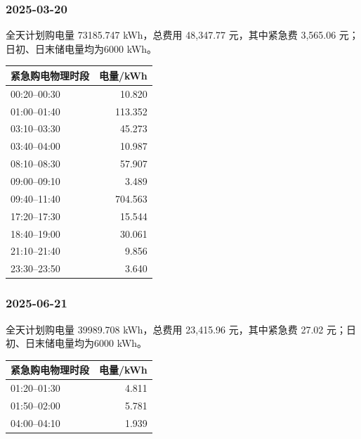 \subsubsection*{2025-03-20}
\begin{center}\small\quad\end{center}
全天计划购电量 73185.747 kWh，总费用 48,347.77 元，其中紧急费 3,565.06 元；日初、日末储电量均为6000 kWh。
\begin{longtable}{lr}\toprule 紧急购电物理时段 & 电量/kWh\\\midrule\endhead
00:20--00:30 & 10.820 \\
01:00--01:40 & 113.352 \\
03:10--03:30 & 45.273 \\
03:40--04:00 & 10.987 \\
08:10--08:30 & 57.907 \\
09:00--09:10 & 3.489 \\
09:40--11:40 & 704.563 \\
17:20--17:30 & 15.544 \\
18:40--19:00 & 30.061 \\
21:10--21:40 & 9.856 \\
23:30--23:50 & 3.640 \\
\bottomrule\end{longtable}
\subsubsection*{2025-06-21}
\begin{center}\small\quad\end{center}
全天计划购电量 39989.708 kWh，总费用 23,415.96 元，其中紧急费 27.02 元；日初、日末储电量均为6000 kWh。
\begin{longtable}{lr}\toprule 紧急购电物理时段 & 电量/kWh\\\midrule\endhead
01:20--01:30 & 4.811 \\
01:50--02:00 & 5.781 \\
04:00--04:10 & 1.939 \\
\bottomrule\end{longtable}
